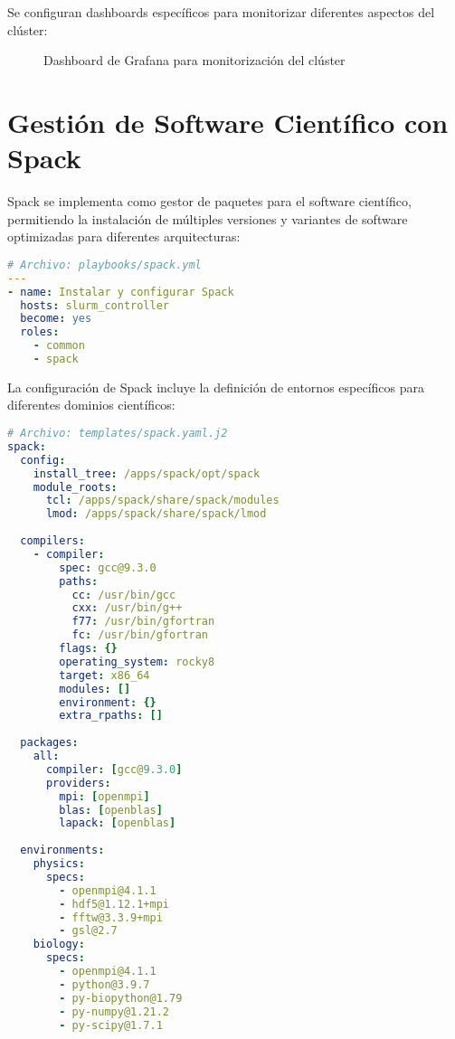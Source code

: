 \documentclass[12pt,a4paper]{report}
\begin{document}
Se configuran dashboards específicos para monitorizar diferentes aspectos del clúster:

\begin{figure}[H]
\centering
\caption{Dashboard de Grafana para monitorización del clúster}
\label{fig:grafana_dashboard}
\end{figure}

\section{Gestión de Software Científico con Spack}

Spack se implementa como gestor de paquetes para el software científico, permitiendo la instalación de múltiples versiones y variantes de software optimizadas para diferentes arquitecturas:

\begin{lstlisting}[language=yaml]
# Archivo: playbooks/spack.yml
---
- name: Instalar y configurar Spack
  hosts: slurm_controller
  become: yes
  roles:
    - common
    - spack
\end{lstlisting}

La configuración de Spack incluye la definición de entornos específicos para diferentes dominios científicos:

\begin{lstlisting}[language=yaml]
# Archivo: templates/spack.yaml.j2
spack:
  config:
    install_tree: /apps/spack/opt/spack
    module_roots:
      tcl: /apps/spack/share/spack/modules
      lmod: /apps/spack/share/spack/lmod
  
  compilers:
    - compiler:
        spec: gcc@9.3.0
        paths:
          cc: /usr/bin/gcc
          cxx: /usr/bin/g++
          f77: /usr/bin/gfortran
          fc: /usr/bin/gfortran
        flags: {}
        operating_system: rocky8
        target: x86_64
        modules: []
        environment: {}
        extra_rpaths: []
  
  packages:
    all:
      compiler: [gcc@9.3.0]
      providers:
        mpi: [openmpi]
        blas: [openblas]
        lapack: [openblas]
  
  environments:
    physics:
      specs:
        - openmpi@4.1.1
        - hdf5@1.12.1+mpi
        - fftw@3.3.9+mpi
        - gsl@2.7
    biology:
      specs:
        - openmpi@4.1.1
        - python@3.9.7
        - py-biopython@1.79
        - py-numpy@1.21.2
        - py-scipy@1.7.1
\end{lstlisting}
\end{document}
